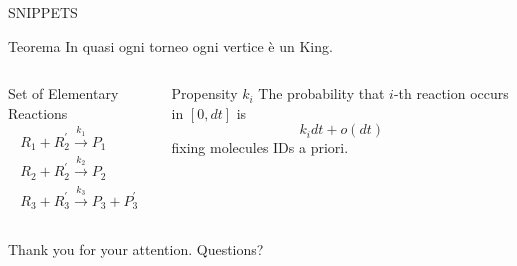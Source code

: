 \documentclass{beamer}
\begin{document}
\begin{frame}{SNIPPETS}
  \begin{center}
    \begin{minipage}{.7 \textwidth}
      \begin{block}{Teorema}
        In quasi ogni torneo ogni vertice è un King.
      \end{block}
    \end{minipage}
  \end{center}
  \begin{columns}
  \begin{column}{.45 \textwidth}
    \begin{block}{Set of Elementary Reactions}
      \begin{equation*}
        \begin{gathered}
          R_1 + R^\prime_2 \xrightarrow{k_1} P_1 \\
          R_2 + R^\prime_2 \xrightarrow{k_2} P_2 \\
          R_3 + R_3^\prime \xrightarrow{k_3} P_3 + P_3^\prime 
        \end{gathered}
      \end{equation*}
    \end{block}
  \end{column} 
  \begin{column}{.45 \textwidth}
    \begin{block}{Propensity $k_i$}
      The probability that $i$-th reaction occurs
      in  $[0, dt]$ is
      $$k_i dt + o(dt)$$
      fixing molecules IDs a priori.
    \end{block}
  \end{column}
\end{columns}
\end{frame}

\begin{frame}
  \begin{center}
  \Huge{Thank you for your attention.}
  \Huge{Questions?}
  \end{center}

\end{frame}
\end{document}
